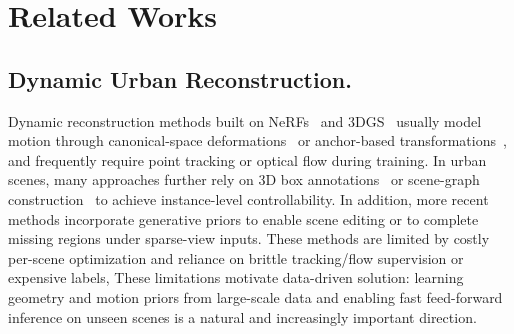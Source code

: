 \section{Related Works}\label{sec:related}

\subsection{Dynamic Urban Reconstruction.}

Dynamic reconstruction methods built on NeRFs~\cite{mildenhall2021nerf} and 3DGS~\cite{kerbl3Dgaussians} usually model motion through canonical-space deformations~\cite{pumarola2021d, wu2022d, fridovich2023k, cao2023hexplane, yang2024deformable, wu20244d} or anchor-based transformations~\cite{li2023dynibar, liu2023robust, luiten2023dynamic, som2024, lu2023dnmp, chen2026periodic}, and frequently require point tracking or optical flow during training. In urban scenes, many approaches further rely on 3D box annotations~\cite{yan2024street, wu2023mars} or scene-graph construction~\cite{zhou2024drivinggaussian,xiong2026drivinggaussian++} to achieve instance-level controllability. In addition, more recent methods\cite{chen2025styledstreets,zhao2025drivedreamer4d, gao2024magicdrive3d, yan2024streetcrafter, yu2025sgd} incorporate generative priors to enable scene editing or to complete missing regions under sparse-view inputs.
These methods are limited by costly per-scene optimization and reliance on brittle tracking/flow supervision or expensive labels,
These limitations motivate data-driven solution: learning geometry and motion priors from large-scale data and enabling fast feed-forward inference on unseen scenes is a natural and increasingly important direction.

